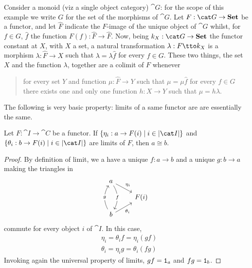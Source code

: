 \begin{example}
   Consider a monoid (viz a single object
  category) \(\cat G\): for the scope of this example we write \(G\)
  for the set of the morphisms of \(\cat G\). Let
  \(F : \cat G \to \Set\) be a functor, and let \(\hat F\) indicate the
  \(F\)-image of the unique object of \(\cat G\) whilst, for
  \(f \in G\), \(\hat f\) the function \(F(f) : \hat F \to \hat F\). Now,
  being \(k_X : \cat G \to \Set\) the functor constant at \(X\), with
  \(X\) a set, a natural transformation \(\lambda : F \tto k_X\) is a
  morphism \(\lambda : \hat F \to X\) such that
  \(\lambda = \lambda \hat f\) for every \(f \in G\). These two things, the set
  \(X\) and the function \(\lambda\), together are a colimit of \(F\)
  whenever
  \begin{quotation}
    for every set \(Y\) and function \(\mu : \hat F \to Y\) such that
    \(\mu = \mu \hat f\) for every \(f \in G\) there exists one and only one
    function \(h : X \to Y\) such that \(\mu = h \lambda\).
  \end{quotation}
   
\end{example}

\noindent{}

The following is very basic property: limits of a same functor are are
essentially the same.

\begin{proposition}\label{proposition:LimitsAreIsomorphic}
  Let \(F : \cat I \to \cat C\) be a functor. If
  \(\set{\eta_i : a \to F(i) \mid i \in \obj{\cat I}}\) and
  \(\set{\theta_i : b \to F(i) \mid i \in \obj{\cat I}}\) are limits of
  \(F\), then \(a \cong b\).
\end{proposition}

\begin{proof}
  By definition of limit, we a have a unique \(f : a \to b\) and a
  unique \(g : b \to a\) making the triangles in
  \[\begin{tikzcd}[row sep=small]
      a \ar["{\eta_i}", dr] \ar["f" description, dd, bend left] \\
      & F(i) \\
      b \ar["{\theta_i}", ur, swap] \ar["g" description, uu, bend left]
    \end{tikzcd}\] commute for every object \(i\) of \(\cat I\). In
  this case,
  \[\begin{aligned}
    & \eta_i = \theta_i f = \eta_i (gf) \\
    & \theta_i = \eta_i g = \theta_i (fg)
  \end{aligned}\]
Invoking again the universal property of limits, \(gf = \mathtt 1_a\) and \(fg = \mathtt 1_b\).
\end{proof}

